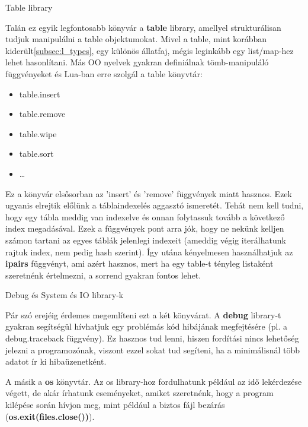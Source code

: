 \bigskip

\Large Table library \normalsize

\bigskip

Talán ez egyik legfontosabb könyvár a \textbf{table} library, amellyel strukturálisan tudjuk manipulálni a table objektumokat. Mivel a table, mint korábban kiderült\ref{subsec:l_types}, egy különös állatfaj, mégis leginkább egy list/map-hez lehet hasonlítani. Más OO nyelvek gyakran definiálnak tömb-manipuláló függvényeket és Lua-ban erre szolgál a table könyvtár:
\begin{itemize}
	\item table.insert
	\item table.remove
	\item table.wipe
	\item table.sort
	\item \dots
\end{itemize}
Ez a könyvár elsősorban az 'insert' és 'remove' függvények miatt hasznos. Ezek ugyanis elrejtik előlünk a táblaindexelés aggasztó ismeretét. Tehát nem kell tudni, hogy egy tábla meddig van indexelve és onnan folytassuk tovább a következő index megadásával. Ezek a függvények pont arra jók, hogy ne nekünk kelljen számon tartani az egyes táblák jelenlegi indexeit (ameddig végig iterálhatunk rajtuk index, nem pedig hash szerint). Így utána kényelmesen használhatjuk az \textbf{ipairs} függvényt, ami azért hasznos, mert ha egy table-t tényleg listaként szeretnénk értelmezni, a sorrend gyakran fontos lehet.

\bigskip

\Large Debug és System és IO library-k \normalsize

\bigskip

Pár szó erejéig érdemes megemlíteni ezt a két könyvárat. A \textbf{debug} library-t gyakran segítségül hívhatjuk egy problémás kód hibájának megfejtésére (pl. a debug.traceback függvény). Ez hasznos tud lenni, hiszen fordítási nincs lehetőség jelezni a programozónak, viszont ezzel sokat tud segíteni, ha a minimálisnál több adatot ír ki hibaüzenetként.

 A másik a \textbf{os} könyvtár. Az os library-hoz fordulhatunk például az idő lekérdezése végett, de akár írhatunk eseményeket, amiket szeretnénk, hogy a program kilépése során hívjon meg, mint például a biztos fájl bezárás (\textbf{os.exit(files.close())}).

